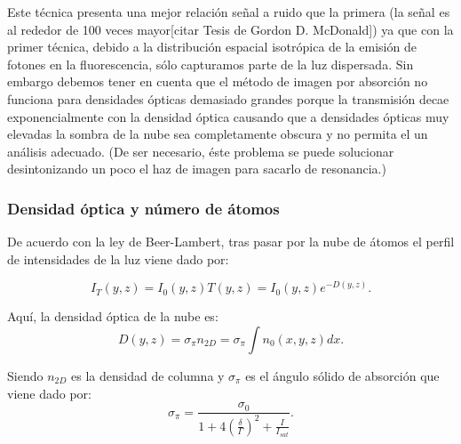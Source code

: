 \documentclass[12pt,twoside]{article}
\begin{document}
Este técnica presenta una mejor relación señal a ruido que la primera (la señal es al rededor de 100 veces mayor[citar Tesis de Gordon D. McDonald]) ya que con la primer técnica, debido a la distribución espacial isotrópica de la emisión de fotones en la fluorescencia, sólo capturamos parte de la luz dispersada. Sin embargo debemos tener en cuenta que el método de imagen por absorción no funciona para densidades ópticas demasiado grandes porque la transmisión decae exponencialmente con la densidad óptica causando que a densidades ópticas muy elevadas la sombra de la nube sea completamente obscura y no permita el un análisis adecuado. (De ser necesario, éste problema se puede solucionar desintonizando un poco el haz de imagen para sacarlo de resonancia.)\\ 
\subsubsection{Densidad óptica y número de átomos}\label{teoDOynum}

De acuerdo con la ley de Beer-Lambert, tras pasar por la nube de átomos el perfil de intensidades de la luz viene dado por:

\begin{equation}
%
    I_{T}(y,z) = I_{0}(y,z)T(y,z) = I_{0}(y,z) e^{-D(y,z)}.
%
\end{equation}

Aquí, la densidad óptica de la nube es:
\begin{equation}
%
    D(y,z) = \sigma_{\pi} n_{2D} = \sigma_{\pi} \int n_{0}(x,y,z) dx.
%
\end{equation}

Siendo $n_{2D}$ es la densidad de columna y $\sigma_{\pi}$ es el ángulo sólido de absorción que viene dado por:
\begin{equation}
%
    \sigma_{\pi} = \frac{\sigma_{0}}{1 + 4(\frac{\delta}{\Gamma})^2 + \frac{I}{I_{sat}}}.
%
\end{equation}
\end{document}
